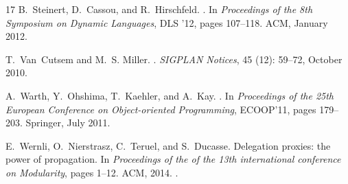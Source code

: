 \documentclass{sigplanconf}
\begin{document}
{\begin{thebibliography}{17}
B.~Steinert, D.~Cassou, and R.~Hirschfeld.
.
\newblock In \emph{Proceedings of the 8th Symposium on Dynamic Languages}, DLS
  '12, pages 107--118. ACM, January 2012.

T.~Van~Cutsem and M.~S. Miller.
.
\newblock \emph{SIGPLAN Notices}, 45 (12): 59--72, October
  2010.

A.~Warth, Y.~Ohshima, T.~Kaehler, and A.~Kay.
.
\newblock In \emph{{Proceedings of the 25th European Conference on
  Object-oriented Programming}}, ECOOP'11, pages 179--203. Springer, July 2011.

E.~Wernli, O.~Nierstrasz, C.~Teruel, and S.~Ducasse.
\newblock Delegation proxies: the power of propagation.
\newblock In \emph{Proceedings of the of the 13th international conference on
  Modularity}, pages 1--12. ACM, 2014.
\newblock {}.

\end{thebibliography}


}
\end{document}
